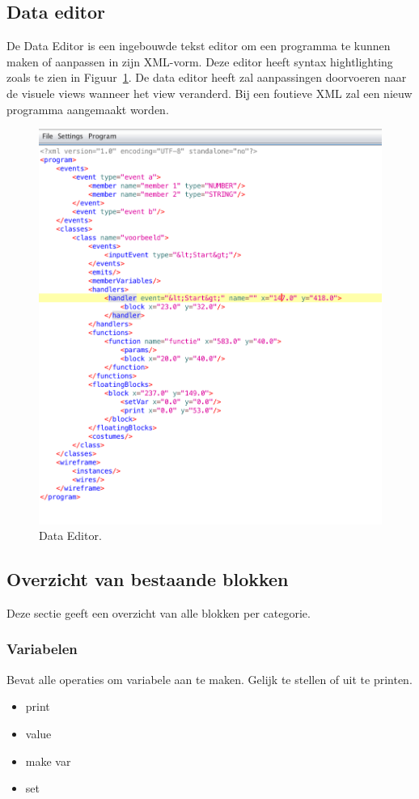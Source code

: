 \documentclass[]{article}
\begin{document}
\subsection{Data editor}
De Data Editor is een ingebouwde tekst editor om een programma te kunnen maken of aanpassen in zijn XML-vorm. Deze editor heeft syntax hightlighting zoals te zien in Figuur~\ref{dataeditordoc}. De data editor heeft zal aanpassingen doorvoeren naar de visuele views wanneer het view veranderd. Bij een foutieve XML zal een nieuw programma aangemaakt worden.
\begin{figure}[H]
  \centering
\includegraphics[scale=0.7]{Documentatie/images/dataeditor}
  \caption{Data Editor.} \label{dataeditordoc}
\end{figure}

\subsection{Overzicht van bestaande blokken}
\label{blokkendoc}
Deze sectie geeft een overzicht van alle blokken per categorie.
\subsubsection{Variabelen}
Bevat alle operaties om variabele aan te maken. Gelijk te stellen of uit te printen. 
\begin{itemize}
\item print
\item value
\item make var
\item set
\end{itemize}
\end{document}
